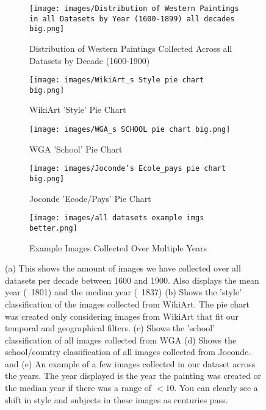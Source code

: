 \documentclass[10pt,twocolumn,letterpaper]{article}
\begin{document}
\begin{figure*}[t]
    \centering
    \begin{subfigure}[t]{\textwidth}
        \centering
        \texttt{[image: images/Distribution of Western Paintings in all Datasets by Year (1600-1899) all decades big.png]}
        \caption{Distribution of Western Paintings Collected Across all Datasets by Decade (1600-1900)}
        \label{fig:subfig-a}
    \end{subfigure}
    
    \begin{subfigure}[t]{0.3\textwidth}
        \texttt{[image: images/WikiArt\_s Style pie chart big.png]}
        \caption{WikiArt 'Style' Pie Chart}
        \label{fig:subfig-b}
    \end{subfigure}
    \hfill
    \begin{subfigure}[t]{0.3\textwidth}
        \texttt{[image: images/WGA\_s SCHOOL pie chart big.png]}
        \caption{WGA 'School' Pie Chart}
        \label{fig:subfig-c}
    \end{subfigure}
    \hfill
    \begin{subfigure}[t]{0.3\textwidth}
        \texttt{[image: images/Joconde's Ecole\_pays pie chart big.png]}
        \caption{Joconde 'Ecode/Pays' Pie Chart}
        \label{fig:subfig-d}
    \end{subfigure}

    \begin{subfigure}[t]{\textwidth}
        \centering
        \texttt{[image: images/all datasets example imgs better.png]}
        \caption{Example Images Collected Over Multiple Years}
        \label{fig:subfig-e}
    \end{subfigure}

    \caption{(a) This shows the amount of images we have collected over all datasets per decade between 1600 and 1900. Also displays the mean year (~1801) and the median year (~1837) (b) Shows the 'style' classification of the images collected from WikiArt. The pie chart was created only considering images from WikiArt that fit our temporal and geographical filters. (c) Shows the 'school' classification of all images collected from WGA (d) Shows the school/country classification of all images collected from Joconde. and (e) An example of a few images collected in our dataset across the years. The year displayed is the year the painting was created or the median year if there was a range of $<10$. You can clearly see a shift in style and subjects in these images as centuries pass.}
    \label{fig:combined-figure}
\end{figure*}
\end{document}
